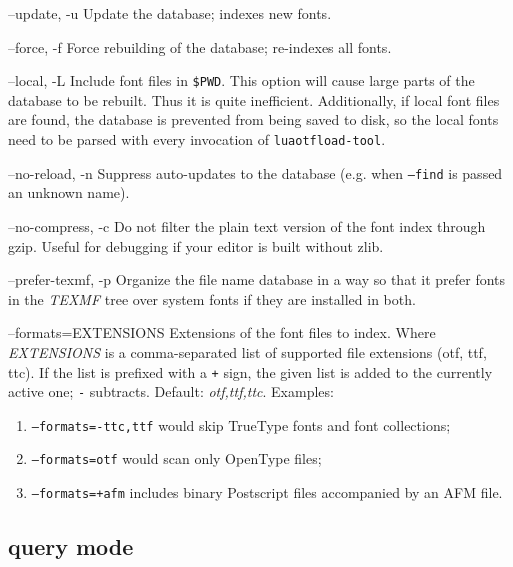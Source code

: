 \documentclass[a4paper]{article}
\providecommand*{\DUoptionlistlabel}[1]{\bf #1 \hfill}
\newenvironment{DUoptionlist}{%
    \list{}{\setlength{\labelwidth}{\DUoptionlistindent}
            \setlength{\rightmargin}{1cm}
            \setlength{\leftmargin}{\rightmargin}
            \addtolength{\leftmargin}{\labelwidth}
            \addtolength{\leftmargin}{\labelsep}
            \renewcommand{\makelabel}{\DUoptionlistlabel}}
  }
  {\endlist}
\begin{document}
\begin{DUoptionlist}
\item[--update, -u]  Update the database; indexes new fonts.

\item[--force, -f]  Force rebuilding of the database; re-indexes
all fonts.

\item[--local, -L]  Include font files in \texttt{\$PWD}. This option
will cause large parts of the database to be
rebuilt. Thus it is quite inefficient.
Additionally, if local font files are found,
the database is prevented from being saved
to disk, so the local fonts need to be parsed
with every invocation of \texttt{luaotfload-tool}.

\item[--no-reload, -n]  Suppress auto-updates to the database (e.g.
when \texttt{--find} is passed an unknown name).

\item[--no-compress, -c]  Do not filter the plain text version of the
font index through gzip. Useful for debugging
if your editor is built without zlib.

\item[--prefer-texmf, -p]  Organize the file name database in a way so
that it prefer fonts in the \emph{TEXMF} tree over
system fonts if they are installed in both.

\item[--formats=EXTENSIONS]  Extensions of the font files to index.
Where \emph{EXTENSIONS} is a comma-separated list of
supported file extensions (otf, ttf, ttc).
If the list is prefixed
with a \texttt{+} sign, the given list is added to
the currently active one; \texttt{-} subtracts.
Default: \emph{otf,ttf,ttc}.
Examples:

\begin{enumerate}
\renewcommand{\labelenumi}{\arabic{enumi})}
\item \texttt{--formats=-ttc,ttf} would skip
TrueType fonts and font collections;

\item \texttt{--formats=otf} would scan only OpenType
files;

\item \texttt{--formats=+afm} includes binary
Postscript files accompanied by an AFM file.
\end{enumerate}
\end{DUoptionlist}


\subsection{query mode%
  \label{query-mode}%
}
\end{document}

